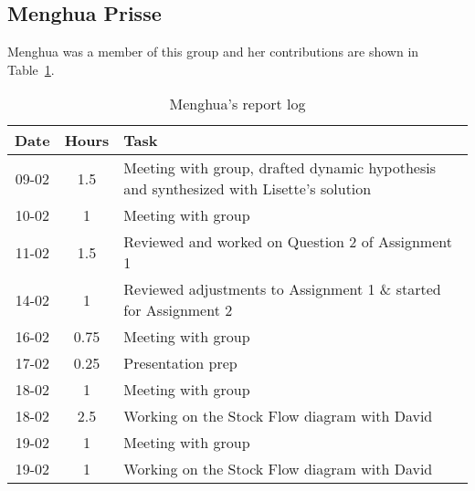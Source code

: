 \subsection{Menghua Prisse}
Menghua was a member of this group and her contributions are shown in Table~\ref{tab:menghua_log}. 
\begin{longtable}[c]{c|c|m{35em}}
\caption{Menghua's report log}
\label{tab:menghua_log}\\
\textbf{Date}& \textbf{Hours} & \textbf{Task} \\
\hline
\endfirsthead
%
\endhead
%
09-02  & 1.5 & Meeting with group, drafted dynamic hypothesis and synthesized with Lisette's solution\\
10-02 & 1 & Meeting with group \\ 
11-02 & 1.5 & Reviewed and worked on Question 2 of Assignment 1 \\
14-02 & 1 & Reviewed adjustments to Assignment 1 \& started for Assignment 2 \\ 
16-02 & 0.75 & Meeting with group \\ 
17-02 & 0.25 & Presentation prep \\
18-02 & 1 & Meeting with group \\ 
18-02 & 2.5 & Working on the Stock Flow diagram with David  \\
19-02 & 1 & Meeting with group \\ 
19-02 & 1 & Working on the Stock Flow diagram with David \\ 
\end{longtable}
